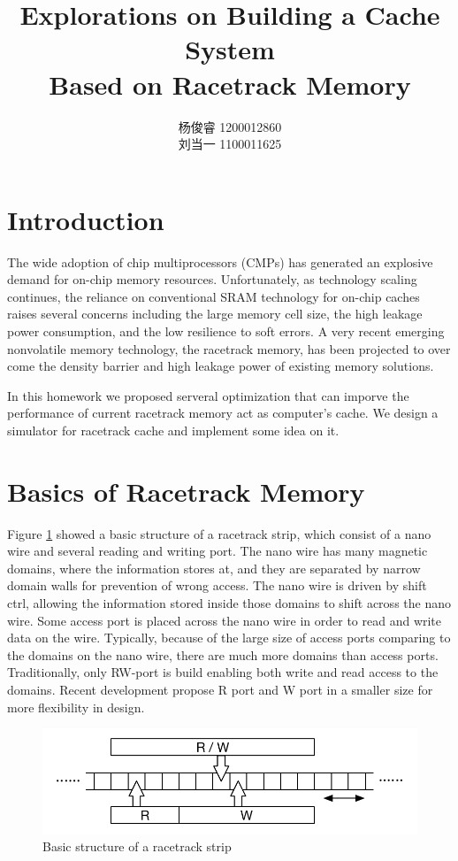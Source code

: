 \documentclass[11pt]{article}
\title{Explorations on Building a Cache System \\ Based on Racetrack Memory}
\author{杨俊睿 1200012860 \\
刘当一 1100011625}
\date{}
\begin{document}
\maketitle


\section{Introduction}

The wide adoption of chip multiprocessors (CMPs) has generated an explosive demand for on-chip memory resources. Unfortunately, as technology scaling continues, the reliance on conventional SRAM technology for on-chip caches raises several concerns including the large memory cell size, the high leakage power consumption, and the low resilience to soft errors. A very recent emerging nonvolatile memory technology, the racetrack memory, has been projected to over come the density barrier and high leakage power of existing memory solutions.

In this homework we proposed serveral optimization that can imporve the performance of current racetrack memory act as computer's cache. We design a simulator for racetrack cache and implement some idea on it.


\section{Basics of Racetrack Memory}

Figure \ref{fig:struct} showed a basic structure of a racetrack strip, which consist of a nano wire and several reading and writing port. The nano wire has many magnetic domains, where the information stores at, and they are separated by narrow domain walls for prevention of wrong access. The nano wire is driven by shift ctrl, allowing the information stored inside those domains to shift across the nano wire. Some access port is placed across the nano wire in order to read and write data on the wire. Typically, because of the large size of access ports comparing to the domains on the nano wire, there are much more domains than access ports. Traditionally, only RW-port is build enabling both write and read access to the domains. Recent development propose R port and W port in a smaller size for more flexibility in design.

\begin{figure}
\centering
\includegraphics{fig1.pdf}
\caption{Basic structure of a racetrack strip}
\label{fig:struct}
\end{figure}
\end{document}
